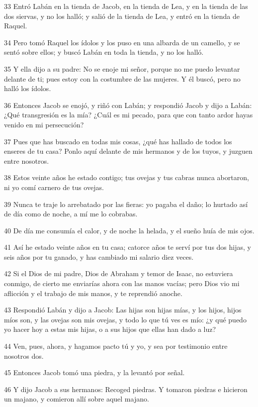 \par 33 Entró Labán en la tienda de Jacob, en la tienda de Lea, y en la tienda de las dos siervas, y no los halló; y salió de la tienda de Lea, y entró en la tienda de Raquel.
\par 34 Pero tomó Raquel los ídolos y los puso en una albarda de un camello, y se sentó sobre ellos; y buscó Labán en toda la tienda, y no los halló.
\par 35 Y ella dijo a su padre: No se enoje mi señor, porque no me puedo levantar delante de ti; pues estoy con la costumbre de las mujeres. Y él buscó, pero no halló los ídolos.
\par 36 Entonces Jacob se enojó, y riñó con Labán; y respondió Jacob y dijo a Labán: ¿Qué transgresión es la mía? ¿Cuál es mi pecado, para que con tanto ardor hayas venido en mi persecución?
\par 37 Pues que has buscado en todas mis cosas, ¿qué has hallado de todos los enseres de tu casa? Ponlo aquí delante de mis hermanos y de los tuyos, y juzguen entre nosotros.
\par 38 Estos veinte años he estado contigo; tus ovejas y tus cabras nunca abortaron, ni yo comí carnero de tus ovejas.
\par 39 Nunca te traje lo arrebatado por las fieras: yo pagaba el daño; lo hurtado así de día como de noche, a mí me lo cobrabas.
\par 40 De día me consumía el calor, y de noche la helada, y el sueño huía de mis ojos.
\par 41 Así he estado veinte años en tu casa; catorce años te serví por tus dos hijas, y seis años por tu ganado, y has cambiado mi salario diez veces.
\par 42 Si el Dios de mi padre, Dios de Abraham y temor de Isaac, no estuviera conmigo, de cierto me enviarías ahora con las manos vacías; pero Dios vio mi aflicción y el trabajo de mis manos, y te reprendió anoche.
\par 43 Respondió Labán y dijo a Jacob: Las hijas son hijas mías, y los hijos, hijos míos son, y las ovejas son mis ovejas, y todo lo que tú ves es mío: ¿y qué puedo yo hacer hoy a estas mis hijas, o a sus hijos que ellas han dado a luz?
\par 44 Ven, pues, ahora, y hagamos pacto tú y yo, y sea por testimonio entre nosotros dos.
\par 45 Entonces Jacob tomó una piedra, y la levantó por señal.
\par 46 Y dijo Jacob a sus hermanos: Recoged piedras. Y tomaron piedras e hicieron un majano, y comieron allí sobre aquel majano.
